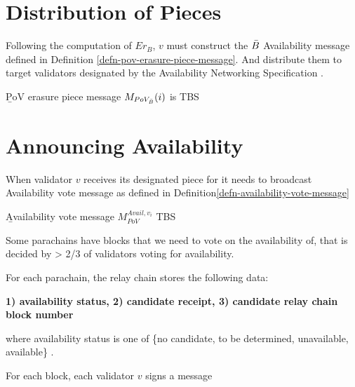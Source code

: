\section{Distribution of Pieces}\label{sect-distribute-pieces}
Following the computation of $Er_B$, $v$ must construct the $\bar{B}$ Availability message defined in Definition \ref{defn-pov-erasure-piece-message}. And distribute them to target validators designated by the Availability Networking Specification \cite{??}.

\begin{definition}
  \label{defn-pov-erasure-piece-message}
        {\b PoV erasure piece message} $M_{PoV_{\bar{B}}}(i)$ is TBS
\end{definition}

\section{Announcing Availability}\label{sect-voting-on-availability}

When validator $v$ receives its designated piece for \blobB it needs to broadcast Availability vote message as defined in Definition\ref{defn-availability-vote-message}
\begin{definition}
  \label{defn-availability-vote-message}
        {\b Availability vote message} $M_{PoV}^{Avail,v_i}$ TBS
\end{definition}

Some parachains have blocks that we need to vote on the availability of, that is decided by > 2/3 of validators voting for availability. 
\newline

For each parachain, the relay chain stores the following data: %

\textbf{1) availability status, 2) candidate receipt, 3) candidate relay chain block number}

where availability status is one of \{no candidate, to be determined, unavailable, available\} .

For each block, each validator $v$ signs a message

